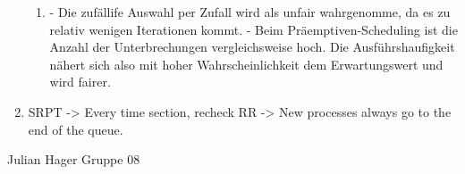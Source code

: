 \begin{enumerate}[label={T\arabic*},start=18]
\begin{enumerate}
			\item 
				- Die zufällife Auswahl per Zufall wird als unfair wahrgenomme, da es zu relativ wenigen Iterationen kommt. 
				- Beim Präemptiven-Scheduling ist die Anzahl der Unterbrechungen vergleichsweise hoch. Die Ausführshaufigkeit nähert sich also mit hoher Wahrscheinlichkeit dem Erwartungswert und wird fairer.

		\end{enumerate}
	\item 
		SRPT -> Every time section, recheck
		RR -> New processes always go to the end of the queue.
\end{enumerate}

Julian Hager
Gruppe 08